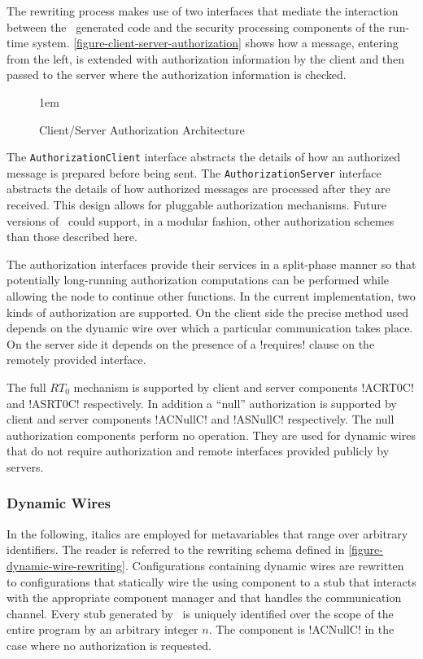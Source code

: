 The rewriting process makes use of two interfaces that mediate the interaction between the
\Sprocket\ generated code and the security processing components of the run-time system.
\autoref{figure-client-server-authorization} shows how a message, entering from the left, is
extended with authorization information by the client and then passed to the server where the
authorization information is checked.

\begin{figure}[htbp]
  
  \centerline{\raise 1em\box\graph}
  \caption{Client/Server Authorization Architecture}
  \label{figure-client-server-authorization}
\end{figure}

The \texttt{AuthorizationClient} interface abstracts the details of how an authorized message is
prepared before being sent. The \texttt{AuthorizationServer} interface abstracts the details of
how authorized messages are processed after they are received. This design allows for pluggable
authorization mechanisms. Future versions of \Sprocket\ could support, in a modular fashion,
other authorization schemes than those described here.

The authorization interfaces provide their services in a split-phase manner so that potentially
long-running authorization computations can be performed while allowing the node to continue
other functions. In the current implementation, two kinds of authorization are supported. On the
client side the precise method used depends on the dynamic wire over which a particular
communication takes place. On the server side it depends on the presence of a !requires! clause
on the remotely provided interface.

The full $RT_0$ mechanism is supported by client and server components !ACRT0C! and !ASRT0C!
respectively. In addition a ``null'' authorization is supported by client and server components
!ACNullC! and !ASNullC! respectively. The null authorization components perform no operation.
They are used for dynamic wires that do not require authorization and remote interfaces provided
publicly by servers.

\subsubsection{Dynamic Wires}

In the following, italics are employed for metavariables that range over arbitrary identifiers. The
reader is referred to the rewriting schema defined in \autoref{figure-dynamic-wire-rewriting}.
Configurations containing dynamic wires are rewritten to configurations that statically wire the
using component  to a stub  that interacts with
the appropriate component manager  and that handles the communication
channel. Every stub generated by \Sprocket\ is uniquely identified over the scope of the entire
program by an arbitrary integer $n$. The  component is !ACNullC! in
the case where no authorization is requested.

